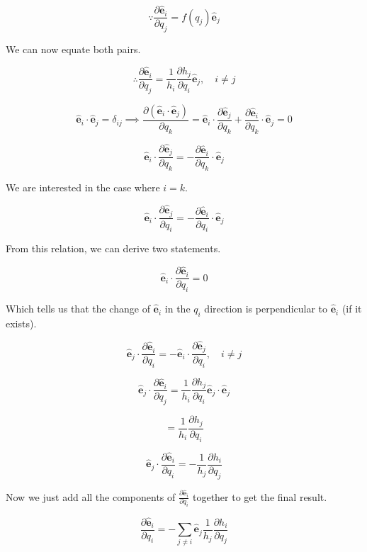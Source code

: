 \documentclass[12pt]{article}
\begin{document}
\[
    \because \frac{\partial \hat{\textbf{e}}_i}{\partial q_j} = f\left(q_j\right)  \hat{\textbf{e}}_j
\]

We can now equate both pairs.

\[
    \therefore\frac{\partial \hat{\textbf{e}}_i}{\partial q_j}
    = \frac{1}{h_i} \frac{\partial h_j}{\partial q_i} \hat{\textbf{e}}_j, \quad i \neq j
\]

\[
    \hat{\textbf{e}}_i \cdot \hat{\textbf{e}}_j = \delta_{ij} \implies
    \frac{\partial \left(\hat{\textbf{e}}_i \cdot \hat{\textbf{e}}_j\right) }{\partial q_k}
    = \hat{\textbf{e}}_i \cdot \frac{\partial \hat{\textbf{e}}_j}{\partial q_k}
    +  \frac{\partial \hat{\textbf{e}}_i}{\partial q_k} \cdot \hat{\textbf{e}}_j = 0
\]

\[
    \hat{\textbf{e}}_i \cdot \frac{\partial \hat{\textbf{e}}_j}{\partial q_k}
    = -\frac{\partial \hat{\textbf{e}}_i}{\partial q_k} \cdot \hat{\textbf{e}}_j
\]

We are interested in the case where \(i = k\).

\[
    \hat{\textbf{e}}_i \cdot \frac{\partial \hat{\textbf{e}}_j}{\partial q_i}
    = -\frac{\partial \hat{\textbf{e}}_i}{\partial q_i} \cdot \hat{\textbf{e}}_j
\]

From this relation, we can derive two statements.

\[
    \hat{\textbf{e}}_i \cdot \frac{\partial \hat{\textbf{e}}_i}{\partial q_i} = 0
\]

Which tells us that the change of \(\hat{\textbf{e}}_i\) in the \(q_i\) direction is
perpendicular to \(\hat{\textbf{e}}_i\) (if it exists).

\[
    \hat{\textbf{e}}_j \cdot \frac{\partial \hat{\textbf{e}}_i}{\partial q_i}
    = - \hat{\textbf{e}}_i \cdot \frac{\partial \hat{\textbf{e}}_j}{\partial q_i}, \quad i \neq j
\]

\[
    \hat{\textbf{e}}_j \cdot \frac{\partial \hat{\textbf{e}}_i}{\partial q_j}
    = \frac{1}{h_i} \frac{\partial h_j}{\partial q_i} \hat{\textbf{e}}_j \cdot \hat{\textbf{e}}_j
\]

\[
    = \frac{1}{h_i} \frac{\partial h_j}{\partial q_i}
\]

\[
    \hat{\textbf{e}}_j \cdot \frac{\partial \hat{\textbf{e}}_i}{\partial q_i}
    = - \frac{1}{h_j} \frac{\partial h_i}{\partial q_j}
\]

Now we just add all the components of \(\frac{\partial \hat{\textbf{e}}_i}{\partial q_i}\)
together to get the final result.

\[
    \frac{\partial \hat{\textbf{e}}_i}{\partial q_i}
    = - \sum_{j \neq i} \hat{\textbf{e}}_j \frac{1}{h_j} \frac{\partial h_i}{\partial q_j}
\]
\end{document}

